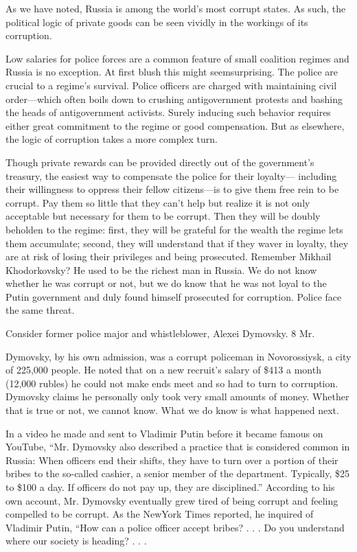 \documentclass[10pt]{article}
\begin{document}
{\large As we have noted, Russia is among the world's most corrupt states. As
such, the political logic of private goods can be seen vividly in the workings of
its corruption.}

{\large Low salaries for police forces are a common feature of small coalition
regimes and Russia is no exception. At first blush this might seemsurprising. The
police are crucial to a regime's survival. Police officers are charged with
maintaining civil order---which often boils down to crushing antigovernment
protests and bashing the heads of antigovernment activists. Surely inducing such
behavior requires either great commitment to the regime or good compensation. But
as elsewhere, the logic of corruption takes a more complex turn.}

{\large Though private rewards can be provided directly out of the government's
treasury, the easiest way to compensate the police for their loyalty--- including
their willingness to oppress their fellow citizens---is to give them free rein to
be corrupt. Pay them so little that they can't help but realize it is not only
acceptable but necessary for them to be corrupt. Then they will be doubly
beholden to the regime: first, they will be grateful for the wealth the regime
lets them accumulate; second, they will understand that if they waver in loyalty,
they are at risk of losing their privileges and being prosecuted. Remember
Mikhail Khodorkovsky? He used to be the richest man in Russia. We do not know
whether he was corrupt or not, but we do know that he was not loyal to the Putin
government and duly found himself prosecuted for corruption. Police face the same
threat.}

{\large Consider former police major and whistleblower, Alexei Dymovsky. 8 Mr.}

{\large Dymovsky, by his own admission, was a corrupt policeman in Novorossiysk,
a city of 225,000 people. He noted that on a new recruit's salary of \$413 a
month (12,000 rubles) he could not make ends meet and so had to turn to
corruption. Dymovsky claims he personally only took very small amounts of money.
Whether that is true or not, we cannot know. What we do know is what happened
next.}

{\large In a video he made and sent to Vladimir Putin before it became famous on
YouTube, ``Mr. Dymovsky also described a practice that is considered common in
Russia: When officers end their shifts, they have to turn over a portion of their
bribes to the so-called cashier, a senior member of the department. Typically,
\$25 to \$100 a day. If officers do not pay up, they are disciplined.'' According
to his own account, Mr. Dymovsky eventually grew tired of being corrupt and
feeling compelled to be corrupt. As the NewYork Times reported, he inquired of
Vladimir Putin, ``How can a police officer accept bribes? . . . Do you understand
where our society is heading? . . .}
\end{document}
